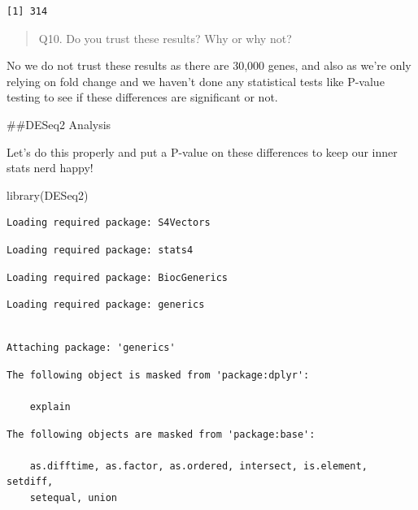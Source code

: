 \documentclass[
  letterpaper,
  DIV=11,
  numbers=noendperiod]{scrartcl}
\newenvironment{Shaded}{\begin{snugshade}}{\end{snugshade}}
\newcommand{\FunctionTok}[1]{\textcolor[rgb]{0.28,0.35,0.67}{#1}}
\newcommand{\NormalTok}[1]{\textcolor[rgb]{0.00,0.23,0.31}{#1}}
\begin{document}
\begin{verbatim}
[1] 314
\end{verbatim}

\begin{quote}
Q10. Do you trust these results? Why or why not?
\end{quote}

No we do not trust these results as there are 30,000 genes, and also as
we're only relying on fold change and we haven't done any statistical
tests like P-value testing to see if these differences are significant
or not.

\#\#DESeq2 Analysis

Let's do this properly and put a P-value on these differences to keep
our inner stats nerd happy!

\begin{Shaded}
\begin{Highlighting}[]
\FunctionTok{library}\NormalTok{(DESeq2)}
\end{Highlighting}
\end{Shaded}

\begin{verbatim}
Loading required package: S4Vectors
\end{verbatim}

\begin{verbatim}
Loading required package: stats4
\end{verbatim}

\begin{verbatim}
Loading required package: BiocGenerics
\end{verbatim}

\begin{verbatim}
Loading required package: generics
\end{verbatim}

\begin{verbatim}

Attaching package: 'generics'
\end{verbatim}

\begin{verbatim}
The following object is masked from 'package:dplyr':

    explain
\end{verbatim}

\begin{verbatim}
The following objects are masked from 'package:base':

    as.difftime, as.factor, as.ordered, intersect, is.element, setdiff,
    setequal, union
\end{verbatim}
\end{document}
